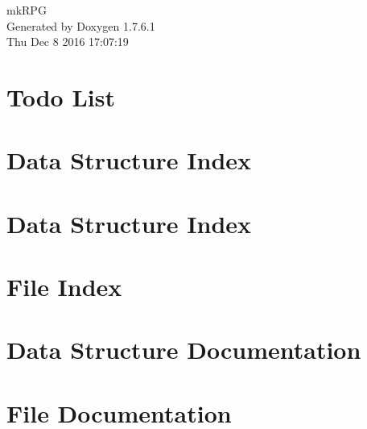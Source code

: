 \documentclass[a4paper]{book}
\begin{document}
\hypersetup{pageanchor=false,citecolor=blue}
\begin{titlepage}
\vspace*{7cm}
\begin{center}
{\Large mk\-R\-P\-G }\\
\vspace*{1cm}
{\large \-Generated by Doxygen 1.7.6.1}\\
\vspace*{0.5cm}
{\small Thu Dec 8 2016 17:07:19}\\
\end{center}
\end{titlepage}
\clearemptydoublepage
{}
\tableofcontents
\clearemptydoublepage
{}
\hypersetup{pageanchor=true,citecolor=blue}
\chapter{\-Todo \-List}
\label{todo}
\hypertarget{todo}{}

\chapter{\-Data \-Structure \-Index}

\chapter{\-Data \-Structure \-Index}

\chapter{\-File \-Index}

\chapter{\-Data \-Structure \-Documentation}













































\chapter{\-File \-Documentation}










\printindex
\end{document}
